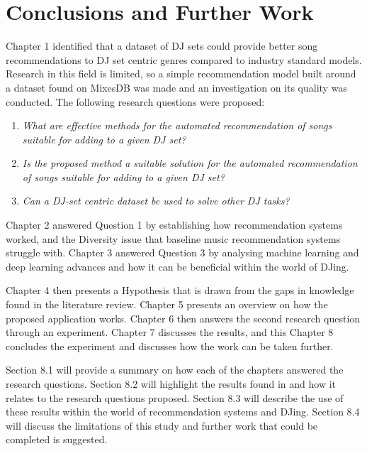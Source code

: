 
\graphicspath{{Chapter7/}}

\chapter{Conclusions and Further Work} 

Chapter 1 identified that a dataset of  DJ sets could provide better song recommendations to DJ set centric genres compared to industry standard models. Research in this field is limited, so a simple recommendation model built around a dataset found on MixesDB was made and an investigation on its quality was conducted. The following research questions were proposed:

\begin{enumerate}
	\item \textit{What are effective methods for the automated recommendation of songs suitable
		for adding to a given DJ set?}
	\item \textit{Is the proposed method a suitable solution for the automated recommendation of songs suitable for adding to a given DJ set?}
	\item \textit{Can a DJ-set centric dataset be used to solve other DJ tasks?}
\end{enumerate}

Chapter 2 answered Question 1 by establishing how recommendation systems worked, and the Diversity issue that baseline music recommendation systems struggle with. Chapter 3 answered Question 3 by analysing machine learning and deep learning advances and how it can be beneficial within the world of DJing. 

Chapter 4 then presents a Hypothesis that is drawn from the gaps in knowledge found in the literature review. Chapter 5 presents an overview on how the proposed application works. Chapter 6 then answers the second research question through an experiment. Chapter 7 discusses the results, and this Chapter 8 concludes the experiment and discusses how the work can be taken further.

Section 8.1 will provide a summary on how each of the chapters answered the research questions.
Section 8.2 will highlight the results found in and how it relates to the research questions proposed. Section 8.3 will describe the use of these results within the world of  recommendation systems and DJing. Section 8.4 will discuss the limitations of
this  study and  further work that could be completed is suggested.

